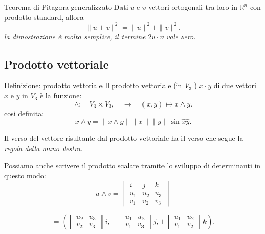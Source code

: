 \documentclass[x11names]{article}
\begin{document}
\begin{center}
\colorbox{myred}{\begin{minipage}{5.75in}
\begin{redes}{Teorema di Pitagora generalizzato}
Dati $u$ e $v$ vettori ortogonali tra loro in $\mathbb{R}^n$ con prodotto standard, allora
\[
\|u+v\|^2 = \|u\|^2 + \|v\|^2
.\] 
\textit{la dimostrazione è molto semplice, il termine $2u\cdot v$ vale zero.}
\end{redes}
\end{minipage}}        
\end{center}


\subsection{Prodotto vettoriale}

\begin{center}
\colorbox{myblue}{\begin{minipage}{5.75in}
\begin{blues}{Definizione: prodotto vettoriale}
Il prodotto vettoriale (in $V_3$ ) $x\cdot y$ di due vettori $x$ e $y$ in $V_3$ è la funzione:
\[
\wedge : \quad V_3 \times V_3, \quad \longrightarrow \quad \left(x,y\right) \mapsto x \wedge y
.\] 
così definita:
\[
x \wedge y  = \|x\wedge y\| \|x\| \|y\| \sin{\hat{xy}}
.\] 

\end{blues}
\end{minipage}}        
\end{center}
Il verso del vettore risultante dal prodotto vettoriale ha il verso che segue la \textit{regola della mano destra}.


\noindent
Possiamo anche scrivere il prodotto scalare tramite lo sviluppo di determinanti in questo modo:
\[
u \wedge v = 
\begin{vmatrix}
     i& j & k \\
     u_1& u_2 & u_3 \\
     v_1& v_2 & v_3 
\end{vmatrix}
\] 

\[
	=
\left(
\begin{vmatrix}
    u_2 & u_3  \\
     v_2& v_3  
\end{vmatrix}i,
- \begin{vmatrix}
    u_1 &u_3 \\
     v_1&v_3   
\end{vmatrix}j, +
\begin{vmatrix}
    u_1 & u_2 \\
     v_1 &  v_2   
\end{vmatrix}k
\right)
.\] 
\end{document}
